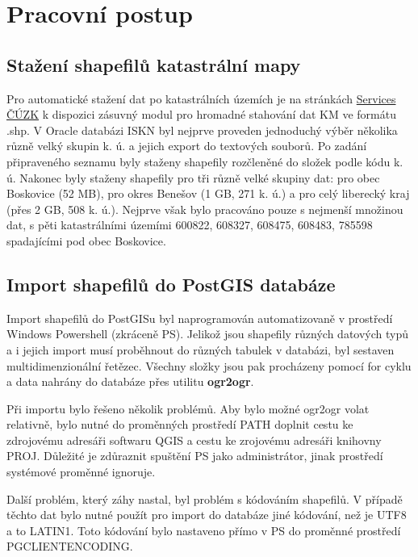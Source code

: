 \documentclass[12pt]{article}
\begin{document}
\clearpage 
\section{Pracovní postup}

\subsection{Stažení shapefilů katastrální mapy} 
Pro automatické stažení dat po katastrálních územích je na stránkách \href{http://services.cuzk.cz/shp/ku/QGIS-plugin/QGIS_verze-3.x/}{Services ČÚZK} k dispozici zásuvný modul pro hromadné stahování dat KM ve formátu .shp. V Oracle databázi ISKN byl nejprve proveden jednoduchý výběr několika různě velký skupin k. ú. a jejich export do textových souborů. Po zadání připraveného seznamu byly staženy shapefily rozčleněné do složek podle kódu k. ú. Nakonec byly staženy shapefily pro tři různě velké skupiny dat:  pro obec Boskovice (52 MB), pro okres Benešov (1 GB, 271 k. ú.) a pro celý liberecký kraj (přes 2 GB, 508 k. ú.). Nejprve však bylo pracováno pouze s nejmenší množinou dat, s pěti katastrálními územími 600822, 608327, 608475, 608483, 785598 spadajícími pod obec Boskovice. 

\subsection{Import shapefilů do PostGIS databáze}
Import shapefilů do PostGISu byl naprogramován automatizovaně v prostředí Windows Powershell (zkráceně PS). Jelikož jsou shapefily různých datových typů a i jejich import musí proběhnout do různých tabulek v databázi, byl sestaven multidimenzionální řetězec. Všechny složky jsou pak procházeny pomocí for cyklu a data nahrány do databáze přes utilitu \textbf{ogr2ogr}.

Při importu bylo řešeno několik problémů. Aby bylo možné ogr2ogr volat relativně, bylo nutné do proměnných prostředí PATH doplnit cestu ke zdrojovému adresáři softwaru QGIS a cestu ke zrojovému adresáři knihovny PROJ. Důležité je zdůraznit spuštění PS jako administrátor, jinak prostředí systémové proměnné ignoruje.

Další problém, který záhy nastal, byl problém s kódováním shapefilů. V případě těchto dat bylo nutné použít pro import do databáze jiné kódování, než je UTF8 a to LATIN1. Toto kódování bylo nastaveno přímo v PS do proměnné prostředí PGCLIENTENCODING.
\end{document}
